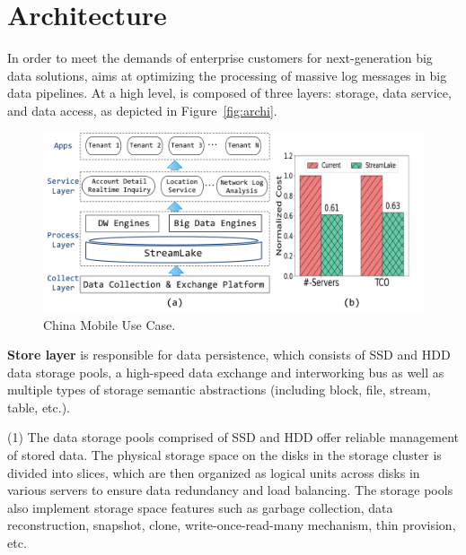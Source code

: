 \section{Architecture} 
\label{sec:archi}


In order to meet the demands of enterprise customers for next-generation big data solutions,  \sys  aims at optimizing the  processing of massive log messages in big data pipelines. At a high level, \sys is composed of three layers: storage, data service, and data access, as depicted in Figure~\ref{fig:archi}.



 
\begin{figure}[!t]
	\centering
	\includegraphics[scale=0.25]{figures/mobile}
	\vspace{-2em}
	\caption{China Mobile Use Case.}
	\label{fig:mobile}
	\vspace{-2.2em}
\end{figure}

\noindent \textbf{Store layer} is responsible for data persistence, which consists of SSD and HDD data storage pools, a high-speed data exchange and interworking bus as well as multiple types of storage semantic abstractions (including block, file, stream, table, etc.).


(1) The data storage pools comprised of SSD and HDD offer reliable management of stored data. The physical storage space on the disks in the storage cluster is divided into slices, which are then organized as logical units across disks in  various servers to ensure data redundancy and load balancing. The storage pools also implement storage space features such as garbage collection, data reconstruction, snapshot, clone, write-once-read-many mechanism, thin provision, etc. 

